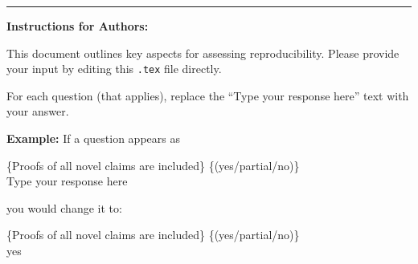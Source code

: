 \documentclass[letterpaper]{article}
\begin{document}
\vspace{1em}

\hrule

\vspace{1em}



\textbf{Instructions for Authors:}



This document outlines key aspects for assessing reproducibility. Please provide your input by editing this \texttt{.tex} file directly.



For each question (that applies), replace the ``Type your response here'' text with your answer.



\vspace{1em}

\noindent

\textbf{Example:} If a question appears as

%

\begin{center}

\noindent

\begin{minipage}{.9\linewidth}

\ttfamily\raggedright

\string\question \{Proofs of all novel claims are included\} \{(yes/partial/no)\} \\

Type your response here

\end{minipage}

\end{center}

you would change it to:

\begin{center}

\noindent

\begin{minipage}{.9\linewidth}

\ttfamily\raggedright

\string\question \{Proofs of all novel claims are included\} \{(yes/partial/no)\} \\

yes

\end{minipage}

\end{center}

%
\end{document}
